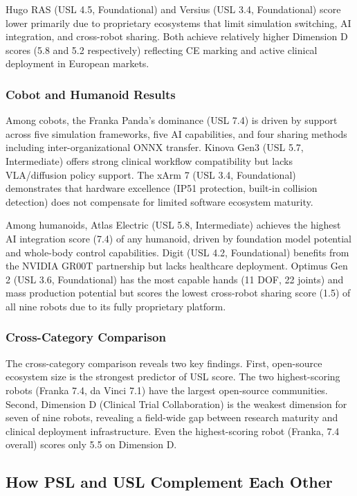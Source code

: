 Hugo RAS (USL 4.5, Foundational) and Versius (USL 3.4, Foundational) score
lower primarily due to proprietary ecosystems that limit simulation switching,
AI integration, and cross-robot sharing. Both achieve relatively higher
Dimension D scores (5.8 and 5.2 respectively) reflecting CE marking and active
clinical deployment in European markets.

\subsubsection{Cobot and Humanoid Results}

Among cobots, the Franka Panda's dominance (USL 7.4) is driven by support
across five simulation frameworks, five AI capabilities, and four sharing
methods including inter-organizational ONNX transfer. Kinova Gen3 (USL 5.7,
Intermediate) offers strong clinical workflow compatibility but lacks
VLA/diffusion policy support. The xArm 7 (USL 3.4, Foundational) demonstrates
that hardware excellence (IP51 protection, built-in collision detection) does
not compensate for limited software ecosystem maturity.

Among humanoids, Atlas Electric (USL 5.8, Intermediate) achieves the highest AI
integration score (7.4) of any humanoid, driven by foundation model potential
and whole-body control capabilities. Digit (USL 4.2, Foundational) benefits
from the NVIDIA GR00T partnership but lacks healthcare deployment. Optimus
Gen 2 (USL 3.6, Foundational) has the most capable hands (11 DOF, 22 joints)
and mass production potential but scores the lowest cross-robot sharing score
(1.5) of all nine robots due to its fully proprietary platform.

\subsubsection{Cross-Category Comparison}

The cross-category comparison reveals two key findings. First, open-source
ecosystem size is the strongest predictor of USL score. The two highest-scoring
robots (Franka 7.4, da Vinci 7.1) have the largest open-source communities.
Second, Dimension D (Clinical Trial Collaboration) is the weakest dimension for
seven of nine robots, revealing a field-wide gap between research maturity and
clinical deployment infrastructure. Even the highest-scoring robot (Franka,
7.4 overall) scores only 5.5 on Dimension D.

\subsection{How PSL and USL Complement Each Other}
\label{subsec:psl-usl-complement}

